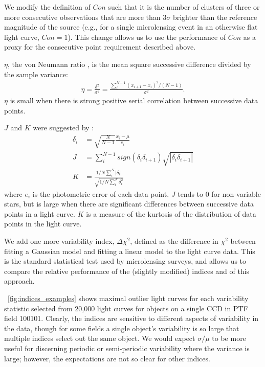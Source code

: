 \documentclass[12pt,preprint]{aastex}
\newcommand{\apwsim}{\raisebox{0.2ex}{\scriptsize$\sim$\normalsize}}
\begin{document}
We modify the definition of $Con$ such that it is the number of clusters of three or more consecutive observations that are more than $3\sigma$ brighter than the reference magnitude of the source (e.g., for a single microlensing event in an otherwise flat light curve, $Con=1$). This change allows us to use the performance of $Con$ as a proxy for the consecutive point requirement described above. 

$\eta$, the von Neumann ratio \citep{von_neumann1941}, is the mean square successive difference divided by the sample variance:
\begin{align}
	\eta = \frac{\delta^2}{\sigma^2} = \frac{\sum^{N-1}_i(x_{i+1} - x_i)^2/(N-1)}{\sigma^2}.
\end{align}
$\eta$ is small when there is strong positive serial correlation between successive data points. 

$J$ and $K$ were suggested by \cite{stetson1996}:
\begin{align}
	\delta_i &= \sqrt{\frac{N}{N-1}}\frac{x_i-\mu}{e_i}\\
	J &= \sum^{N-1}_i sign(\delta_i \delta_{i+1})\sqrt{|\delta_i \delta_{i+1}|}\\
	K &= \frac{1/N\sum^N_i |\delta_i|}{\sqrt{1/N\sum^N_i\delta_i^2}}
\end{align}
where $e_i$ is the photometric error of each data point. $J$ tends to 0 for non-variable stars, but is large when there are significant differences between successive data points in a light curve. $K$ is a measure of the kurtosis of the distribution of data points in the light curve.

We add one more variability index, $\Delta \chi^2$, defined as the difference in $\chi^2$ between fitting a Gaussian model and fitting a linear model to the light curve data. This is the standard statistical test used by microlensing surveys, and allows us to compare the relative performance of the (slightly modified) \cite{shin2009} indices and of this approach. 

\figurename~\ref{fig:indices_examples} shows maximal outlier light curves for each variability statistic selected from \apwsim20,000 light curves for objects on a single CCD in PTF field 100101. Clearly, the indices are sensitive to different aspects of variability in the data, though for some fields a single object's variability is so large that multiple indices select out the same object. We would expect $\sigma/\mu$ to be more useful for discerning periodic or semi-periodic variability where the variance is large; however, the expectations are not so clear for other indices. 
\end{document}
